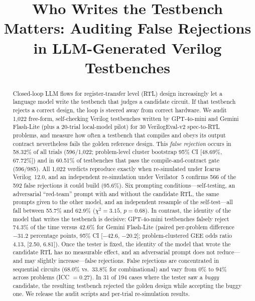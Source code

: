 \documentclass[conference]{IEEEtran}
\begin{document}
\title{Who Writes the Testbench Matters: Auditing False Rejections in LLM-Generated Verilog Testbenches}

\author{
}

\maketitle

\begin{abstract}
Closed-loop LLM flows for register-transfer level (RTL) design increasingly let a language model write the testbench that judges a candidate circuit. If that testbench rejects a correct design, the loop is steered away from correct hardware. We audit 1,022 free-form, self-checking Verilog testbenches written by GPT-4o-mini and Gemini Flash-Lite (plus a 20-trial local-model pilot) for 30 VerilogEval-v2 spec-to-RTL problems, and measure how often a testbench that compiles and obeys its output contract nevertheless fails the golden reference design. This \textit{false rejection} occurs in 58.32\% of all trials (596/1,022; problem-level cluster bootstrap 95\% CI [48.69\%, 67.72\%]) and in 60.51\% of testbenches that pass the compile-and-contract gate (596/985). All 1,022 verdicts reproduce exactly when re-simulated under Icarus Verilog~12.0, and an independent re-simulation under Verilator~5 confirms 566 of the 592 false rejections it could build (95.6\%). Six prompting conditions---self-testing, an adversarial ``red-team'' prompt with and without the candidate RTL, the same prompts given to the other model, and an independent resample of the self-test---all fall between 55.7\% and 62.9\% ($\chi^2 = 3.15$, $p = 0.68$). In contrast, the identity of the model that writes the testbench is decisive: GPT-4o-mini testbenches falsely reject 74.3\% of the time versus 42.6\% for Gemini Flash-Lite (paired per-problem difference $-31.2$ percentage points, 95\% CI [$-42.6$, $-20.2$]; problem-clustered GEE odds ratio 4.13, [2.50, 6.81]). Once the tester is fixed, the identity of the model that wrote the candidate RTL has no measurable effect, and an adversarial prompt does not reduce---and may slightly increase---false rejections. False rejections are concentrated in sequential circuits (68.0\% vs.\ 33.8\% for combinational) and vary from 0\% to 94\% across problems (ICC $= 0.27$). In 31 of 194 cases where the tester saw a \textit{buggy} candidate, the resulting testbench rejected the golden design while accepting the buggy one. We release the audit scripts and per-trial re-simulation results.
\end{abstract}
\end{document}
